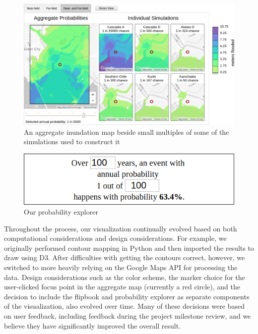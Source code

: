 \documentclass{vgtc}                          %
\begin{document}
\begin{figure}
    \centering
    \includegraphics[width=\columnwidth]{pictures/wholevis.png}
    \caption{An aggregate inundation map beside small multiples of some of the simulations used to construct it}
    \label{fig:whole-vis}
\end{figure}


\begin{figure}
    \centering
    \includegraphics[width=\columnwidth]{pictures/prob_explorer.png}
    \caption{Our probability explorer}
    \label{fig:prob-explorer}
\end{figure}

Throughout the process, our visualization continually evolved based on both computational considerations and design considerations. For example, we originally performed contour mapping in Python and then imported the results to draw using D3. After difficulties with getting the contours correct, however, we switched to more heavily relying on the Google Maps API for processing the data. Design considerations such as the color scheme, the marker choice for the user-clicked focus point in the aggregate map (currently a red circle), and the decision to include the flipbook and probability explorer as separate components of the visualization, also evolved over time. Many of these decisions were based on user feedback, including feedback during the project milestone review, and we believe they have significantly improved the overall result.
\end{document}
